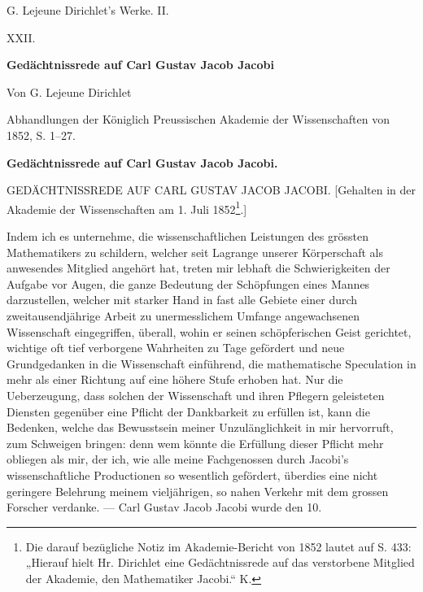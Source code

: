 \documentclass[11pt]{article}
\begin{document}
\begin{center}
{\Large G. Lejeune Dirichlet's Werke. II.}\par\vspace{1.2em}
{\Large XXII.}\par\vspace{0.5em}
{\LARGE \textbf{Gedächtnissrede auf Carl Gustav Jacob Jacobi}}\par\vspace{1em}
{\large Von G. Lejeune Dirichlet}\par\vspace{0.5em}
{\small Abhandlungen der Königlich Preussischen Akademie der Wissenschaften von 1852, S. 1--27.}
\end{center}

\bigskip
\begin{center}
{\large \textbf{Gedächtnissrede auf Carl Gustav Jacob Jacobi.}}
\end{center}

GEDÄCHTNISSREDE AUF CARL GUSTAV JACOB JACOBI. [Gehalten in der Akademie der Wissenschaften am 1. Juli 1852\footnote{Die darauf bezügliche Notiz im Akademie-Bericht von 1852 lautet auf S. 433: „Hierauf hielt Hr. Dirichlet eine Gedächtnissrede auf das verstorbene Mitglied der Akademie, den Mathematiker Jacobi.“ K.}.]

Indem ich es unternehme, die wissenschaftlichen Leistungen des grössten Mathematikers zu schildern, welcher seit Lagrange unserer Körperschaft als anwesendes Mitglied angehört hat, treten mir lebhaft die Schwierigkeiten der Aufgabe vor Augen, die ganze Bedeutung der Schöpfungen eines Mannes darzustellen, welcher mit starker Hand in fast alle Gebiete einer durch zweitausendjährige Arbeit zu unermesslichem Umfange angewachsenen Wissenschaft eingegriffen, überall, wohin er seinen schöpferischen Geist gerichtet, wichtige oft tief verborgene Wahrheiten zu Tage gefördert und neue Grundgedanken in die Wissenschaft einführend, die mathematische Speculation in mehr als einer Richtung auf eine höhere Stufe erhoben hat. Nur die Ueberzeugung, dass solchen der Wissenschaft und ihren Pflegern geleisteten Diensten gegenüber eine Pflicht der Dankbarkeit zu erfüllen ist, kann die Bedenken, welche das Bewusstsein meiner Unzulänglichkeit in mir hervorruft, zum Schweigen bringen: denn wem könnte die Erfüllung dieser Pflicht mehr obliegen als mir, der ich, wie alle meine Fachgenossen durch Jacobi’s wissenschaftliche Productionen so wesentlich gefördert, überdies eine nicht geringere Belehrung meinem vieljährigen, so nahen Verkehr mit dem grossen Forscher verdanke. — Carl Gustav Jacob Jacobi wurde den 10.
\end{document}
